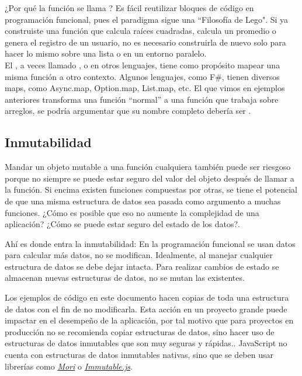 \documentclass{article}
\newcommand{\codejs}[1]{\tcbox{\lstinline[style=ES6]{#1}}}
\newenvironment{info}[1]
  {\begin{bclogo}[logo=\bcinfo, couleurBarre=orange, noborder=true, couleur=white]{#1}}
  {\end{bclogo}}
\begin{document}
\begin{info}{¿Por qué la función se llama \codejs{map}?}
Es fácil reutilizar bloques de código en programación funcional, pues el paradigma sigue una ``Filosofía de Lego". Si ya construiste una función que calcula raíces cuadradas, calcula un promedio o genera el registro de un usuario, no es necesario construirla de nuevo solo para hacer lo mismo sobre una lista o en un entorno paralelo\cite{fp-toolkit}.\\
El \codejs{map}, a veces llamado \codejs{fmap}, \codejs{lift} o \codejs{Select} en otros lenguajes, tiene como propósito mapear una misma función a otro contexto. Algunos lenguajes, como F\#, tienen diversos maps, como Async.map, Option.map, List.map, etc. El \codejs{map} que vimos en ejemplos anteriores transforma una función ``normal'' \medspace a una función que trabaja sobre arreglos, se podría argumentar que su nombre completo debería ser \codejs{Array.map}.
\end{info}


\subsection{Inmutabilidad}
Mandar un objeto mutable a una función cualquiera también puede ser riesgoso porque no siempre se puede estar seguro del valor del objeto después de llamar a la función. Si encima existen funciones compuestas por otras, se tiene el potencial de que una misma estructura de datos sea pasada como argumento a muchas funciones. ¿Cómo es posible que eso no aumente la complejidad de una aplicación? ¿Cómo se puede estar seguro del estado de los datos?. 

Ahí es donde entra la inmutabilidad: En la programación funcional se usan datos para calcular más datos, no se modifican. Idealmente, al manejar cualquier estructura de datos se debe dejar intacta. Para realizar cambios de estado se almacenan nuevas estructuras de datos, no se mutan las existentes.

Los ejemplos de código en este documento hacen copias de toda una estructura de datos con el fin de no modificarla. Esta acción en un proyecto grande puede impactar en el desempeño de la aplicación, por tal motivo que para proyectos en producción no se recomienda copiar estructuras de datos, sino hacer uso de estructuras de datos inmutables que son muy seguras y rápidas.\cite{immutable-data-structures}. JavaScript no cuenta con estructuras de datos inmutables nativas, sino que se deben usar librerías como \href{https://www.npmjs.com/package/mori}{\textit{Mori}} o \href{https://immutable-js.com/}{\textit{Immutable.js}}.
\end{document}
